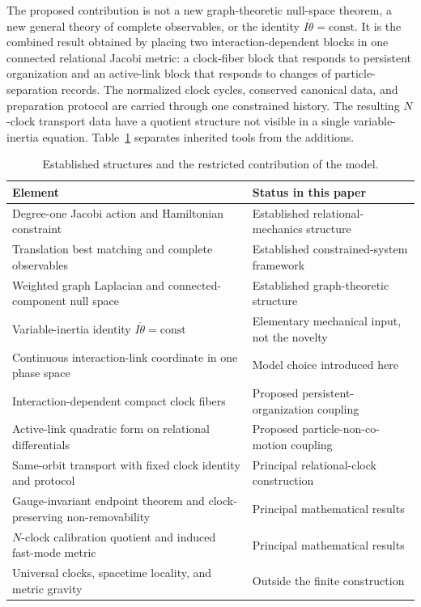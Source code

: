 \documentclass[11pt]{article}
\theoremstyle{plain}
\begin{document}
The proposed contribution is not a new graph-theoretic null-space theorem, a
new general theory of complete observables, or the identity
$I\dot\theta=\mathrm{const}$.  It is the combined result obtained by placing
two interaction-dependent blocks in one connected relational Jacobi metric:
a clock-fiber block that responds to persistent organization and an active-link
block that responds to changes of particle-separation records.  The normalized
clock cycles, conserved canonical data, and preparation protocol are carried
through one constrained history.  The resulting $N$-clock transport data have
a quotient structure not visible in a single variable-inertia equation.
Table~\ref{tab:scope} separates inherited tools from the additions.

\begin{table}[ht]
\centering
\small
\begin{tabularx}{\textwidth}{@{}>{\raggedright\arraybackslash}X>{\raggedright\arraybackslash}X@{}}
\toprule
Element & Status in this paper\\
\midrule
Degree-one Jacobi action and Hamiltonian constraint & Established relational-mechanics structure\\
Translation best matching and complete observables & Established constrained-system framework\\
Weighted graph Laplacian and connected-component null space & Established graph-theoretic structure\\
Variable-inertia identity $I\dot\theta=\mathrm{const}$ & Elementary mechanical input, not the novelty\\
Continuous interaction-link coordinate in one phase space & Model choice introduced here\\
Interaction-dependent compact clock fibers & Proposed persistent-organization coupling\\
Active-link quadratic form on relational differentials & Proposed particle-non-co-motion coupling\\
Same-orbit transport with fixed clock identity and protocol & Principal relational-clock construction\\
Gauge-invariant endpoint theorem and clock-preserving non-removability & Principal mathematical results\\
$N$-clock calibration quotient and induced fast-mode metric & Principal mathematical results\\
Universal clocks, spacetime locality, and metric gravity & Outside the finite construction\\
\bottomrule
\end{tabularx}
\caption{Established structures and the restricted contribution of the model.}
\label{tab:scope}
\end{table}
\end{document}
